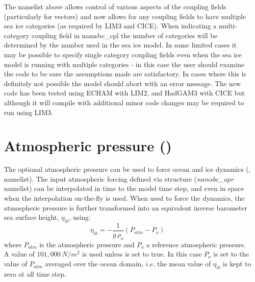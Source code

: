 \documentclass[../tex_main/NEMO_manual]{subfiles}
\begin{document}
The namelist above allows control of various aspects of the coupling fields (particularly for vectors) and
now allows for any coupling fields to have multiple sea ice categories (as required by LIM3 and CICE).
When indicating a multi-category coupling field in namsbc{\_}cpl the number of categories will be determined by
the number used in the sea ice model.
In some limited cases it may be possible to specify single category coupling fields even when
the sea ice model is running with multiple categories -
in this case the user should examine the code to be sure the assumptions made are satisfactory.
In cases where this is definitely not possible the model should abort with an error message.
The new code has been tested using ECHAM with LIM2, and HadGAM3 with CICE but
although it will compile with  additional minor code changes may be required to run using LIM3.


\section{Atmospheric pressure (\protect{})}
\label{sec:SBC_apr}


The optional atmospheric pressure can be used to force ocean and ice dynamics
(, \textit{} namelist).
The input atmospheric forcing defined via  structure (\textit{namsbc\_apr} namelist)
can be interpolated in time to the model time step, and even in space when the interpolation on-the-fly is used.
When used to force the dynamics, the atmospheric pressure is further transformed into
an equivalent inverse barometer sea surface height, $\eta_{ib}$, using:
\begin{equation} \label{eq:SBC_ssh_ib}
	\eta_{ib} = -  \frac{1}{g\,\rho_o}  \left( P_{atm} - P_o \right) 
\end{equation}
where $P_{atm}$ is the atmospheric pressure and $P_o$ a reference atmospheric pressure.
A value of $101,000~N/m^2$ is used unless  is set to true.
In this case $P_o$ is set to the value of $P_{atm}$ averaged over the ocean domain,
$i.e.$ the mean value of $\eta_{ib}$ is kept to zero at all time step.
\end{document}
